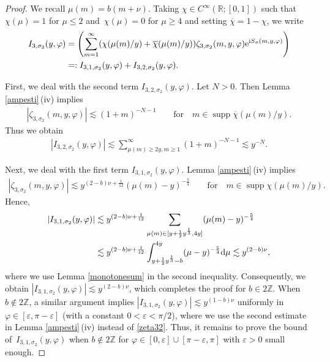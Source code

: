\documentclass[10pt,a4paper]{amsart}
\numberwithin{equation}{section}
\def\R{\mathbb{R}}%
\DeclareMathOperator{\supp}{supp}%
\def\e{\varepsilon}
\def\f{\varphi}
\def\m{\mu}
\def\n{\nu}
\def\s{\sigma}
\def\z{\zeta}
\begin{document}
\begin{proof}We recall $\m(m)=b(m+\n)$. Taking $\chi\in C^{\infty}(\R;[0,1])$ such that $\chi(\m)=1$ for $\m\leq 2$ and~${\chi(\m)=0}$ for $\m\geq 4$ and setting $\overline{\chi}=1-\chi$, we write
\begin{align*}
I_{3,\s_2}(y,\f)&= \left(\sum_{m=1}^{\infty}(\chi(\m(m)/y)+\overline{\chi}(\m(m)/y)) \z_{3,\s_2}(m,y,\f){\rm e}^{{\rm i}S_{\s}(m,y,\f)} \right)\\
&=: I_{3,1,\s_2}(y,\f)+I_{3,2,\s_2}(y,\f).
\end{align*}

First, we deal with the second term $I_{3,2,\s_2}(y,\f)$. Let $N>0$. Then Lemma \ref{ampesti}\,(iv) implies
\begin{align*}
|\z_{3,\s_2}(m,y,\f)|\lesssim (1+m)^{-N-1}\qquad \text{for}\quad m\in \supp \overline{\chi}(\m(m)/y).
\end{align*}
Thus we obtain
\begin{align*}
|I_{3,2,\s_2}(y,\f)|\lesssim \sum_{\m(m)\geq 2y,m\geq 1}^{\infty}(1+m)^{-N-1}\lesssim y^{-N}.
\end{align*}

Next, we deal with the first term $I_{3,1,\s_2}(y,\f)$. Lemma \ref{ampesti}\,(iv) implies
\begin{align}\label{zeta32}
|\z_{3,\s_2}(m,y,\f)|\lesssim y^{(2-b)\n+\frac{1}{12}}(\m(m)-y)^{-\frac{5}{4}}\qquad \text{for}\quad m\in \supp \chi(\m(m)/y).
\end{align}
Hence,
\begin{align*}
|I_{3,1,\s_2}(y,\f)|\lesssim{}& y^{(2-b)\n+\frac{1}{12}}\sum_{\m(m)\in [y+\frac{1}{2}y^{\frac{1}{3}},4y]}(\m(m)-y)^{-\frac{5}{4}}\\
\lesssim{}& y^{(2-b)\n+\frac{1}{12}}\int_{y+\frac{1}{2}y^{\frac{1}{3}}-b}^{4y}(\m-y)^{-\frac{5}{4}}{\rm d}\m
\lesssim y^{(2-b)\n},
\end{align*}
where we use Lemma \ref{monotonesum} in the second inequality.
Consequently, we obtain $|I_{3,1,\s_2}(y,\f)|\lesssim y^{(2-b)\n}$, which completes the proof for $b\in 2\mathbb{Z}$. When $b\notin 2\mathbb{Z}$, a similar argument implies $|I_{3,1,\s_2}(y,\f)|\lesssim y^{(1-b)\n}$ uniformly in $ \f\in [\e,\pi-\e]$ (with a constant $0<\e<\pi/2$), where we use the second estimate in Lemma \ref{ampesti}\,(iv) instead of \eqref{zeta32}. Thus, it remains to prove the bound of~${I_{3,1,\s_2}(y,\f)}$ when $b\notin 2\mathbb{Z}$ for $\f\in [0,\e]\cup [\pi-\e,\pi]$ with $\e>0$ small enough.


\end{proof}
\end{document}
